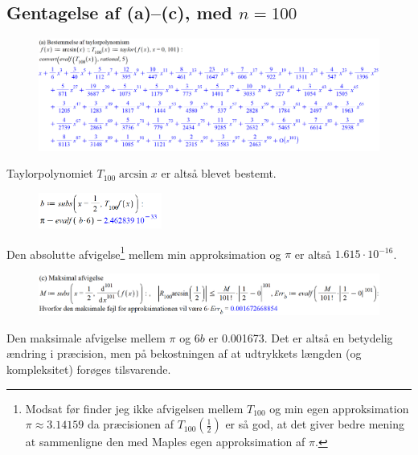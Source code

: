 \documentclass{report}
\begin{document}
\subsection{Gentagelse af (a)--(c), med $n=100$}
\begin{figure}[H]
    \centering
    \includegraphics[width=1.2\textwidth]{43da.png}
\end{figure}
Taylorpolynomiet $T_{100}\arcsin{x}$ er altså blevet bestemt. 
\begin{figure}[H]
    \centering
    \includegraphics[width=0.36\textwidth]{43db.png}
\end{figure}
Den absolutte afvigelse\footnote{Modsat før finder jeg ikke afvigelsen mellem $T_{100}$ og min egen approksimation $\pi\approx3.14159$ da præcisionen af $T_{100}(\frac{1}{2})$ er så god, at det giver bedre mening at sammenligne den med Maples egen approksimation af $\pi$.} mellem min approksimation og $\pi$ er altså $1.615\cdot10^{-16}$. 
\begin{figure}[H]
    \centering
    \includegraphics[width=1\textwidth]{43dc.png}
\end{figure}
Den maksimale afvigelse mellem $\pi$ og $6b$ er 0.001673. Det er altså en betydelig ændring i præcision, men på bekostningen af at udtrykkets længden (og kompleksitet) forøges tilsvarende.
\end{document}

